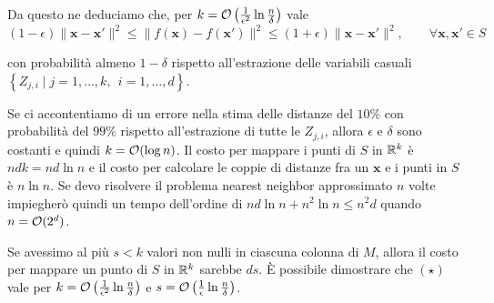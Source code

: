 Da questo ne deduciamo che, per $k = \mathcal{O} \left(\frac{1}{\epsilon^2} \ln \frac{n}{\delta}\right)$ vale
\[ (1 - \epsilon) \|\bm x - \bm x'\|^2 \leq \|f(\bm x) - f(\bm x')\|^2 \leq (1 + \epsilon) \|\bm x - \bm x'\|^2, \qquad \forall \bm x, \bm x' \in S \tag*{($\star$)} \]

con probabilità almeno $1 - \delta$ rispetto all'estrazione delle variabili casuali $\left\{Z_{j,i} \mid j = 1, \dots, k, \ \ i = 1, \dots, d \right\}$.

Se ci accontentiamo di un errore nella stima delle distanze del $10\%$ con probabilità del $99\%$ rispetto all'estrazione di tutte le $Z_{j,i}$, allora $\epsilon$ e $\delta$ sono costanti e quindi $k = \mathcal{O} (\log n)$. Il costo per mappare i punti di $S$ in $\mathbb{R}^k$ è $ndk = nd \ln n$ e il costo per calcolare le coppie di distanze fra un $\bm x$ e i punti in $S$ è $n \ln n$. Se devo risolvere il problema nearest neighbor approssimato $n$ volte impiegherò quindi un tempo dell'ordine di $nd \ln n + n^2 \ln n \leq n^2 d$ quando $n = \mathcal{O}(2^d)$.

Se avessimo al più $s < k$ valori non nulli in ciascuna colonna di $M$, allora il costo per mappare un punto di $S$ in $\mathbb{R}^k$ sarebbe $ds$. \`E possibile dimostrare che $(\star)$ vale per $k = \mathcal{O} \left(\frac{1}{\epsilon^2} \ln \frac{n}{\delta}\right)$ e $s = \mathcal{O} \left(\frac{1}{\epsilon} \ln \frac{n}{\delta}\right)$.

